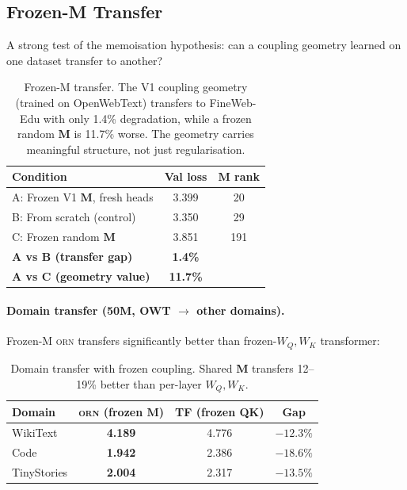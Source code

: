 \documentclass[10pt,twocolumn]{article}
\newcommand{\M}{\mathbf{M}}
\newcommand{\orn}{\textsc{orn}}
\begin{document}
\subsection{Frozen-M Transfer}

A strong test of the memoisation hypothesis: can a coupling geometry learned on one dataset transfer to another?

\begin{table}[h]
\centering\small
\begin{tabular}{@{}lcc@{}}
\toprule
\textbf{Condition} & \textbf{Val loss} & \textbf{$\M$ rank} \\
\midrule
A: Frozen V1 $\M$, fresh heads & 3.399 & 20 \\
B: From scratch (control) & 3.350 & 29 \\
C: Frozen random $\M$ & 3.851 & 191 \\
\midrule
\textbf{A vs B (transfer gap)} & \textbf{1.4\%} & \\
\textbf{A vs C (geometry value)} & \textbf{11.7\%} & \\
\bottomrule
\end{tabular}
\caption{Frozen-M transfer. The V1 coupling geometry (trained on OpenWebText) transfers to FineWeb-Edu with only 1.4\% degradation, while a frozen random $\M$ is 11.7\% worse. The geometry carries meaningful structure, not just regularisation.}
\label{tab:frozen}
\end{table}

\paragraph{Domain transfer (50M, OWT $\to$ other domains).}
Frozen-M \orn{} transfers significantly better than frozen-$W_Q,W_K$ transformer:

\begin{table}[t]
\centering\footnotesize
\begin{tabular}{@{}lccc@{}}
\toprule
\textbf{Domain} & \textbf{\orn{} (frozen $\M$)} & \textbf{TF (frozen QK)} & \textbf{Gap} \\
\midrule
WikiText & \textbf{4.189} & 4.776 & $-12.3\%$ \\
Code & \textbf{1.942} & 2.386 & $-18.6\%$ \\
TinyStories & \textbf{2.004} & 2.317 & $-13.5\%$ \\
\bottomrule
\end{tabular}
\caption{Domain transfer with frozen coupling. Shared $\M$ transfers 12--19\% better than per-layer $W_Q, W_K$.}
\label{tab:transfer}
\end{table}
\end{document}

